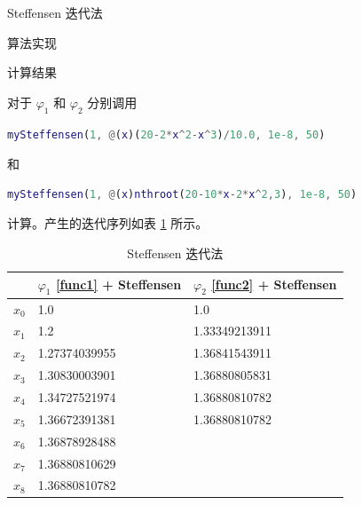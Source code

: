 \documentclass[a4paper]{article}
\begin{document}
\begin{multicols}{2}
\begin{section}{Steffensen 迭代法}
\begin{subsection}{算法实现}
	\end{subsection}
	
	\begin{subsection}{计算结果}
	
		对于 $\varphi_1$ 和 $\varphi_2$ 分别调用
		\begin{lstlisting}[language=Matlab]
mySteffensen(1, @(x)(20-2*x^2-x^3)/10.0, 1e-8, 50)
		\end{lstlisting} 和
		\begin{lstlisting}[language=Matlab]
mySteffensen(1, @(x)nthroot(20-10*x-2*x^2,3), 1e-8, 50)
		\end{lstlisting} 计算。产生的迭代序列如表 \ref{table_steff} 所示。
		
		\begin{table}[H]
		\caption{Steffensen 迭代法}
		\centering
		\label{table_steff}
		\begin{tabular}{l|l|l}
		\hline
		      & $\varphi_1$ \ref{func1} + Steffensen & $\varphi_2$ \ref{func2} + Steffensen \\ \hline
		$x_0$ & 1.0                                                   & 1.0                                                   \\
		$x_1$ & 1.2                                                   & 1.33349213911                                         \\
		$x_2$ & 1.27374039955                                         & 1.36841543911                                         \\
		$x_3$ & 1.30830003901                                         & 1.36880805831                                         \\
		$x_4$ & 1.34727521974                                         & 1.36880810782                                         \\
		$x_5$ & 1.36672391381                                         & 1.36880810782                                         \\
		$x_6$ & 1.36878928488                                         &                                                       \\
		$x_7$ & 1.36880810629                                         &                                                       \\
		$x_8$ & 1.36880810782                                         &                                                      
		\end{tabular}
		\end{table}


\end{subsection}
\end{section}
\end{multicols}
\end{document}
